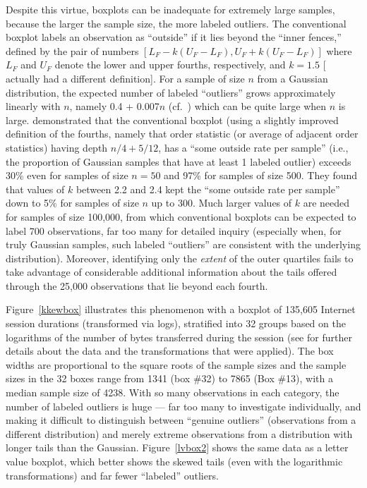 \documentclass[oneside]{article}
\begin{document}
Despite this virtue, boxplots can be inadequate for 
extremely large samples, because the larger the sample 
size, the more labeled outliers.
The conventional boxplot \citep{eda, emerson83}  labels an observation as ``outside'' if it lies 
beyond the ``inner fences,'' defined by the pair of 
numbers $[L_F - k(U_F - L_F), U_F + k(U_F - L_F)]$ 
where $L_F$ and $U_F$ denote the lower and upper
fourths, respectively, and $k = 1.5$ [\citet{eda}
actually had a different definition].
For a sample of size $n$ from a Gaussian distribution,
the expected number of labeled ``outliers'' grows 
approximately linearly with $n$, namely 
0.4 + 0.007$n$ 
(cf.~\citet{dchlv}) %
which can be quite large when $n$ is large.  
\citet[1148]{dchbox} demonstrated that the
conventional boxplot (using a slightly improved definition
of the fourths, namely that order statistic (or average of
adjacent order statistics) having depth $n/4 + 5/12$,
has a ``some outside rate per sample'' (i.e., the proportion
of Gaussian samples that have at least 1 labeled outlier) 
exceeds 30\% even for samples of size $n = 50$ and 97\%
for samples of size 500.
They found that values of $k$ between 2.2 and 2.4 kept the
``some outside rate per sample'' down to 5\% for samples
of size $n$ up to 300. 
Much larger values of $k$ are needed for samples of size 
100,000, from which conventional boxplots can be expected to
label 700 observations, far too many for detailed inquiry 
(especially when, for truly Gaussian samples, such labeled 
``outliers'' are consistent with the underlying distribution).
Moreover, identifying only the \textit{extent} of the outer
quartiles fails to take advantage of considerable additional
information about the tails offered through the 25,000 
observations that lie beyond each fourth.

Figure~\ref{kkewbox} illustrates this phenomenon with a boxplot 
of 135,605 Internet session durations (transformed via logs), 
stratified into 32 groups based on the logarithms of the number 
of bytes transferred during the session (see \citet{kw06}
for further details about the data and the transformations
that were applied).  The box widths are proportional to the
square roots of the sample sizes \citep{variations.boxplots} and the sample sizes in the 32 boxes range from 1341
(box \#32) to 7865 (Box \#13), with a median sample size 
of 4238. With so many observations in each category,
the number of labeled outliers is huge --- far too many to
investigate individually, and making it difficult to
distinguish between ``genuine outliers'' (observations
from a different distribution) and merely extreme observations
from a distribution with longer tails than the Gaussian.
Figure~\ref{lvbox2} shows the same data as a letter value boxplot,
which better shows the skewed tails (even with the logarithmic
transformations) and far fewer ``labeled'' outliers.
\end{document}
